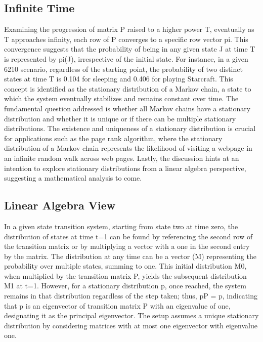\subsection*{Infinite Time}
Examining the progression of matrix P raised to a higher power T, eventually as T approaches infinity, each row of P converges to a specific row vector pi.
This convergence suggests that the probability of being in any given state J at time T is represented by pi(J), irrespective of the initial state.
For instance, in a given 6210 scenario, regardless of the starting point, the probability of two distinct states at time T is 0.104 for sleeping and 0.406 for playing Starcraft.
This concept is identified as the stationary distribution of a Markov chain, a state to which the system eventually stabilizes and remains constant over time.
The fundamental question addressed is whether all Markov chains have a stationary distribution and whether it is unique or if there can be multiple stationary distributions.
The existence and uniqueness of a stationary distribution is crucial for applications such as the page rank algorithm, where the stationary distribution of a Markov chain represents the likelihood of visiting a webpage in an infinite random walk across web pages.
Lastly, the discussion hints at an intention to explore stationary distributions from a linear algebra perspective, suggesting a mathematical analysis to come.

\subsection*{Linear Algebra View}
In a given state transition system, starting from state two at time zero, the distribution of states at time t=1 can be found by referencing the second row of the transition matrix or by multiplying a vector with a one in the second entry by the matrix.
The distribution at any time can be a vector (M) representing the probability over multiple states, summing to one.
This initial distribution M0, when multiplied by the transition matrix P, yields the subsequent distribution M1 at t=1.
However, for a stationary distribution p, once reached, the system remains in that distribution regardless of the step taken; thus, pP = p, indicating that p is an eigenvector of transition matrix P with an eigenvalue of one, designating it as the principal eigenvector.
The setup assumes a unique stationary distribution by considering matrices with at most one eigenvector with eigenvalue one.

